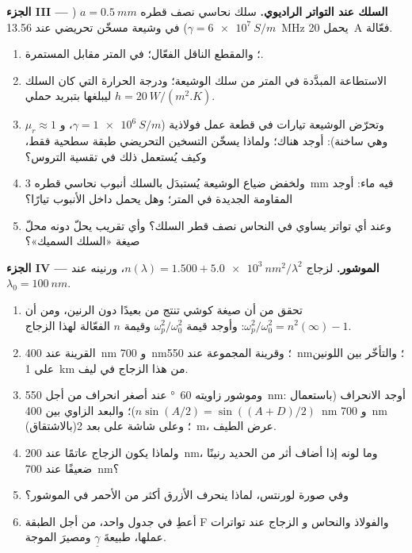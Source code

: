 \begin{problem}
\medskip
\noindent\textbf{الجزء III --- السلك عند التواتر الراديوي.}
سلك نحاسي نصف قطره $a = \qty{0.5}{mm}$ ($\gamma = \qty{6e7}{S/m}$) في وشيعة
مسخّن تحريضي عند \qty{13.56}{MHz} يحمل \qty{20}{A} فعّالة.
\begin{enumerate}[resume]
  \item {}؛ والمقطع الناقل الفعّال؛  في
        المتر مقابل المستمرة.
  \item الاستطاعة المبدَّدة في المتر من سلك الوشيعة؛ ودرجة الحرارة التي
        كان السلك ليبلغها بتبريد حملي $h = \qty{20}{W/(m^2.K)}$.
  \item وتحرّض الوشيعة تيارات في قطعة عمل فولاذية ($\gamma =
        \qty{1e6}{S/m}$، و $\mu_r \approx 1$ وهي ساخنة): أوجد  هناك؛ ولماذا
        يسخّن التسخين التحريضي طبقة سطحية فقط، وكيف يُستعمل
        ذلك في تقسية التروس؟
  \item ولخفض ضياع الوشيعة يُستبدَل بالسلك أنبوب نحاسي قطره \qty{3}{mm}
        فيه ماء: أوجد المقاومة الجديدة في المتر؛ وهل يحمل
        داخل الأنبوب تيارًا؟
  \item وعند أي تواتر يساوي  في النحاس نصف قطر
        السلك؟ وأي تقريب يحلّ دونه محلّ صيغة
        «السلك السميك»؟
\end{enumerate}

\medskip
\noindent\textbf{الجزء IV --- الموشور.}
لزجاج $n(\lambda) = 1.500 + \qty{5.0e3}{nm^2}/\lambda^2$، ورنينه
عند $\lambda_0 = \qty{100}{nm}$.
\begin{enumerate}[resume]
  \item تحقق من أن صيغة كوشي تنتج من  بعيدًا
        دون الرنين، ومن أن $\omega_p^2/\omega_0^2 = n^2(\infty) - 1$: وأوجد قيمة
        $\omega_p^2/\omega_0^2$ وقيمة $n$ الفعّالة لهذا الزجاج.
  \item القرينة  عند \qty{400}{nm} و \qty{700}{nm}؛ وقرينة
        المجموعة عند \qty{550}{nm}؛ والتأخّر بين اللونين على
        \qty{1}{km} من هذا الزجاج في ليف.
  \item وموشور زاويته \qty{60}{\degree} عند أصغر انحراف من أجل \qty{550}{nm}:
        أوجد الانحراف (باستعمال $n\sin(A/2) = \sin((A + D)/2)$)؛ والبعد الزاوي
        بين \qty{400}{nm} و \qty{700}{nm} (بالاشتقاق)؛ وعلى شاشة
        على بعد \qty{2}{m}، عرض الطيف.
  \item ولماذا يكون الزجاج عاتمًا عند \qty{200}{nm}، وما
        لونه إذا أضاف أثر من الحديد رنينًا ضعيفًا عند \qty{700}{nm}؟
  \item وفي صورة لورنتس، لماذا ينحرف الأزرق أكثر من الأحمر في
        الموشور؟
  \item أعطِ في جدول واحد، من أجل الطبقة F والفولاذ والنحاس و
        الزجاج عند تواترات عملها، طبيعةَ
        $\underline\gamma$ ومصيرَ الموجة.
\end{enumerate}
\end{problem}
